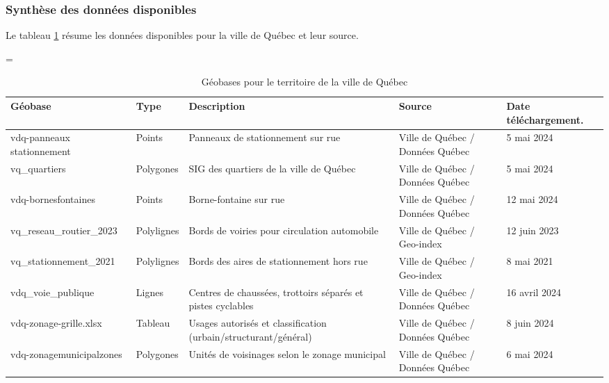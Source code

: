     \subsubsection{Synthèse des données disponibles}
      Le tableau \ref{tab:donnees_disponibles_Québec} résume les données disponibles pour la ville de Québec et leur source.
      \begin{landscape}
        \LTcapwidth=\textwidth
      \begin{longtable}[h!]{p{.2 \linewidth} p{.1 \linewidth} p{.3 \linewidth} p{.15\linewidth} p{.125\linewidth} }
        
        
        \hline
        Géobase & Type & Description  & Source & Date téléchargement.\\ 
        \hline
        \hline
        \endhead
        \hline
        \endfoot
        \hline
        \caption{Géobases pour le territoire de la ville de Québec}
        \label{tab:donnees_disponibles_Québec}
        \endlastfoot
        vdq-panneaux stationnement    & Points        & Panneaux de stationnement sur rue          & Ville de Québec / Données Québec  & 5 mai 2024 \\
        \hline
        vq\_quartiers & Polygones & SIG des quartiers de la ville de Québec & Ville de Québec / Données Québec & 5 mai 2024 \\
        \hline
        vdq-bornesfontaines          & Points        & Borne-fontaine sur rue                   & Ville de Québec / Données Québec & 12 mai 2024 \\
        \hline
        vq\_reseau\_routier\_2023 & Polylignes    & Bords de voiries pour circulation automobile  & Ville de Québec / Geo-index  & 12 juin 2023\\ 
        \hline
        vq\_stationnement\_2021  & Polylignes    & Bords des aires de stationnement hors rue & Ville de Québec / Geo-index & 8 mai 2021\\
        \hline
        vdq\_voie\_publique            & Lignes        & Centres de chaussées, trottoirs séparés et pistes cyclables & Ville de Québec / Données Québec & 16 avril 2024 \\
        \hline
        vdq-zonage-grille.xlsx          & Tableau        & Usages autorisés et classification (urbain/structurant/général) & Ville de Québec / Données Québec & 8 juin 2024 \\
        \hline
        vdq-zonagemunicipalzones          & Polygones        & Unités de voisinages selon le zonage municipal & Ville de Québec / Données Québec & 6 mai 2024 \\

\end{longtable}
\end{landscape}
